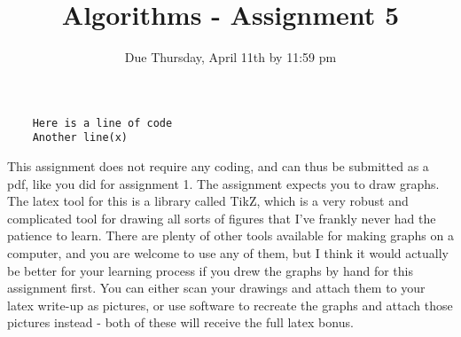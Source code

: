 \documentclass[12pt]{article}
\title{Algorithms - Assignment 5}
\date{Due Thursday, April 11th by 11:59 pm}
\begin{document}
\maketitle
\begin{lstlisting}
    Here is a line of code
    Another line(x)
\end{lstlisting}
This assignment does not require any coding, and can thus be submitted as a pdf, like you did for assignment 1. The assignment expects you to draw graphs. The latex tool for this is a library called TikZ, which is a very robust and complicated tool for drawing all sorts of figures that I've frankly never had the patience to learn. There are plenty of other tools available for making graphs on a computer, and you are welcome to use any of them, but I think it would actually be better for your learning process if you drew the graphs by hand for this assignment first. You can either scan your drawings and attach them to your latex write-up as pictures, or use software to recreate the graphs and attach those pictures instead - both of these will receive the full latex bonus. 
\end{document}
